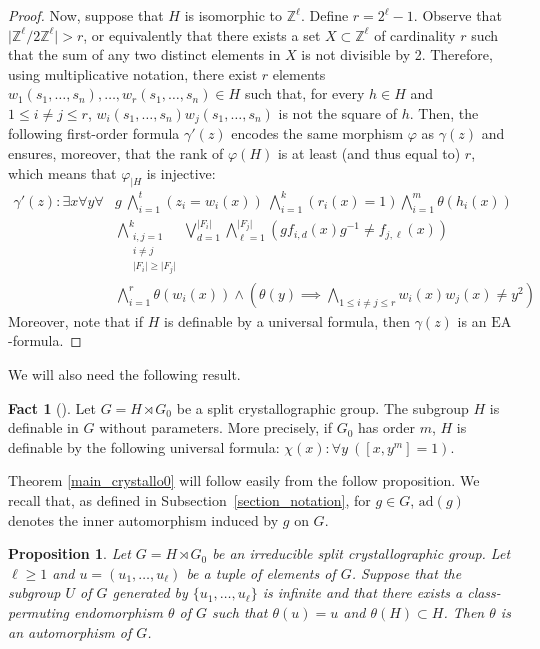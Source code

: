 \documentclass[a4paper, 11pt]{amsart}
\newtheorem{prop}[te]{Proposition}
\theoremstyle{definition}
\newtheorem{fact}[te]{Fact}
\theoremstyle{remark}
\renewcommand{\leq}{\leqslant}
\renewcommand{\geq}{\geqslant}
\begin{document}
\begin{proof}
\smallskip \noindent Now, suppose that $H$ is isomorphic to $\mathbb{Z}^{\ell}$. Define $r=2^{\ell}-1$. Observe that $\vert \mathbb{Z}^{\ell}/2\mathbb{Z}^{\ell}\vert>r$, or equivalently that there exists a set $X\subset \mathbb{Z}^{\ell}$ of cardinality $r$ such that the sum of any two distinct elements in $X$ is not divisible by 2. Therefore, using multiplicative notation, there exist $r$ elements $w_1(s_1,\ldots,s_n),\ldots,w_r(s_1,\ldots,s_n)\in H$ such that, for every $h\in H$ and $1\leq i\neq j\leq r$, $w_i(s_1,\ldots,s_n)w_j(s_1,\ldots,s_n)$ is not the square of $h$. Then, the following first-order formula $\gamma'(z)$ encodes the same morphism $\varphi$ as $\gamma(z)$ and ensures, moreover, that the rank of $\varphi(H)$ is at least (and thus equal to) $r$, which means that $\varphi_{\vert H}$ is injective:
\begin{align*}
\gamma'(z): \exists x \forall y \forall & g \ \bigwedge_{i=1}^{t}(z_i=w_i(x)) \ \bigwedge_{i=1}^k(r_i(x)=1) \bigwedge_{i=1}^m\theta(h_i(x))  \\
           &\bigwedge\limits_{\substack{i,j=1 \\ i \neq j \\ \vert F_i\vert\geq \vert F_j\vert}}^{k}\bigvee_{d=1}^{\vert F_i\vert}\bigwedge_{\ell=1}^{\vert F_j\vert}(gf_{i,d}(x)g^{-1}\neq f_{j,\ell}(x)) \\
           & \bigwedge_{i=1}^r\theta(w_i(x))\wedge \left(\theta(y)\implies \bigwedge_{1\leq i\neq j\leq r} w_i(x)w_j(x)\neq y^2\right)
\end{align*}
 Moreover, note that if $H$ is definable by a universal formula, then $\gamma(z)$ is an $\mathrm{EA}$-formula.\end{proof}

We will also need the following result.

\begin{fact}[{\cite[Proposition 3.4]{PS23}}]\label{definable}
Let $G=H\rtimes G_0$ be a split crystallographic group. The subgroup $H$ is definable in $G$ without parameters. More precisely, if $G_0$ has order $m$, $H$ is definable by the following universal formula: $\chi(x): \forall y \ ([x, y^m] = 1).$
\end{fact}

Theorem \ref{main_crystallo0} will follow easily from the follow proposition. We recall that, as defined in Subsection~\ref{section_notation}, for $g \in G$, $\mathrm{ad}(g)$ denotes the inner automorphism induced by $g$ on $G$.

\begin{prop}\label{15janvier2026}
Let $G=H\rtimes G_0$ be an irreducible split crystallographic group. Let $\ell\geq 1$ and $u=(u_1,\ldots,u_{\ell})$ be a tuple of elements of $G$. Suppose that the subgroup $U$ of $G$ generated by $\lbrace u_1,\ldots,u_{\ell}\rbrace$ is infinite and that there exists a class-permuting endomorphism $\theta$ of $G$ such that $\theta(u)=u$ and $\theta(H)\subset H$. Then $\theta$ is an automorphism of $G$.
\end{prop}
\end{document}
